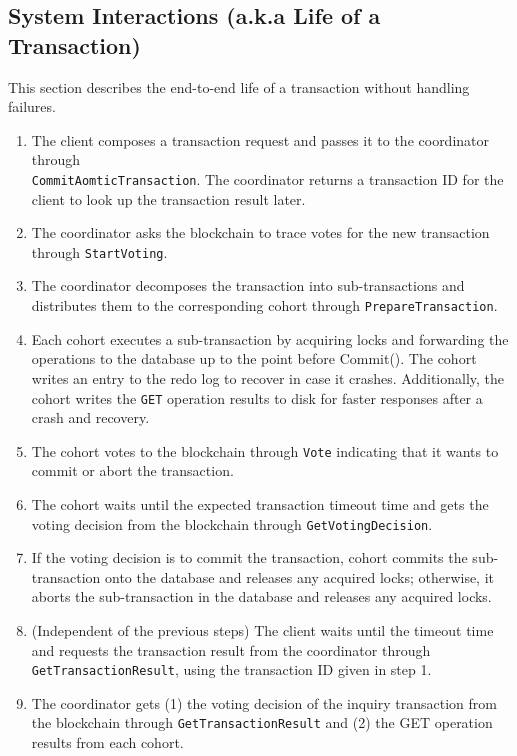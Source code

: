 \documentclass[11pt,conference]{IEEEtran}
\begin{document}
\subsection{System Interactions (a.k.a Life of a Transaction)} \label{txnflow}
This section describes the end-to-end life of a transaction without handling failures.

\begin{enumerate}
  \item The client composes a transaction request and passes it to the coordinator through \texttt{\\CommitAomticTransaction}. The coordinator returns a transaction ID for the client to look up the transaction result later.
  \item The coordinator asks the blockchain to trace votes for the new transaction through \texttt{StartVoting}.
  \item The coordinator decomposes the transaction into sub-transactions and distributes them to the corresponding cohort through \texttt{PrepareTransaction}.
  \item Each cohort executes a sub-transaction by acquiring locks and forwarding the operations to the database up to the point before Commit(). The cohort writes an entry to the redo log to recover in case it crashes. Additionally, the cohort writes the \texttt{GET} operation results to disk for faster responses after a crash and recovery.
  \item The cohort votes to the blockchain through \texttt{Vote} indicating that it wants to commit or abort the transaction.
  \item The cohort waits until the expected transaction timeout time and gets the voting decision from the blockchain through \texttt{GetVotingDecision}.
  \item If the voting decision is to commit the transaction, cohort commits the sub-transaction onto the database and releases any acquired locks; otherwise, it aborts the sub-transaction in the database and releases any acquired locks.
  \item (Independent of the previous steps) The client waits until the timeout time and requests the transaction result from the coordinator through \texttt{GetTransactionResult}, using the transaction ID given in step 1.
  \item The coordinator gets (1) the voting decision of the inquiry transaction from the blockchain through \texttt{GetTransactionResult} and (2) the GET operation results from each cohort.
\end{enumerate}
\end{document}
